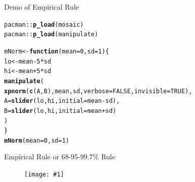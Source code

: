 \documentclass[handout]{beamer}\usepackage[]{graphicx}\usepackage[]{color}
\newcommand{\hlnum}[1]{\textcolor[rgb]{0.686,0.059,0.569}{#1}}%
\newcommand{\hlopt}[1]{\textcolor[rgb]{0,0,0}{#1}}%
\newcommand{\hlstd}[1]{\textcolor[rgb]{0.345,0.345,0.345}{#1}}%
\newcommand{\hlkwa}[1]{\textcolor[rgb]{0.161,0.373,0.58}{\textbf{#1}}}%
\newcommand{\hlkwb}[1]{\textcolor[rgb]{0.69,0.353,0.396}{#1}}%
\newcommand{\hlkwc}[1]{\textcolor[rgb]{0.333,0.667,0.333}{#1}}%
\newcommand{\hlkwd}[1]{\textcolor[rgb]{0.737,0.353,0.396}{\textbf{#1}}}%
\newenvironment{knitrout}{}{} %
\newcommand {\framedgraphic}[1] {
	\begin{figure}
		\centering
		\texttt{[image: \#1]}
	\end{figure}
}
\begin{document}
\begin{frame}[fragile]{Demo of Empirical Rule}

\begin{knitrout}\scriptsize
{}\color{fgcolor}
\begin{alltt}
\hlstd{pacman}\hlopt{::}\hlkwd{p_load}\hlstd{(mosaic)}
\hlstd{pacman}\hlopt{::}\hlkwd{p_load}\hlstd{(manipulate)}

\hlstd{mNorm} \hlkwb{<-} \hlkwa{function}\hlstd{(}\hlkwc{mean} \hlstd{=} \hlnum{0}\hlstd{,} \hlkwc{sd} \hlstd{=} \hlnum{1}\hlstd{) \{}
  \hlstd{lo} \hlkwb{<-} \hlstd{mean} \hlopt{-} \hlnum{5} \hlopt{*} \hlstd{sd}
  \hlstd{hi} \hlkwb{<-} \hlstd{mean} \hlopt{+} \hlnum{5} \hlopt{*} \hlstd{sd}
  \hlkwd{manipulate}\hlstd{(}
        \hlkwd{xpnorm}\hlstd{(}\hlkwd{c}\hlstd{(A,B), mean, sd,} \hlkwc{verbose} \hlstd{=} \hlnum{FALSE}\hlstd{,} \hlkwc{invisible} \hlstd{=} \hlnum{TRUE}\hlstd{),}
        \hlkwc{A} \hlstd{=} \hlkwd{slider}\hlstd{(lo, hi,} \hlkwc{initial} \hlstd{= mean} \hlopt{-} \hlstd{sd),}
        \hlkwc{B} \hlstd{=} \hlkwd{slider}\hlstd{(lo, hi,} \hlkwc{initial} \hlstd{= mean} \hlopt{+} \hlstd{sd)}
 \hlstd{)}
\hlstd{\}}
\hlkwd{mNorm}\hlstd{(}\hlkwc{mean} \hlstd{=} \hlnum{0}\hlstd{,} \hlkwc{sd} \hlstd{=} \hlnum{1}\hlstd{)}
\end{alltt}

\end{knitrout}
\end{frame}


\begin{frame}[fragile]{Empirical Rule or 68-95-99.7\% Rule}

\framedgraphic{6899rule.png}

\end{frame}
\end{document}
